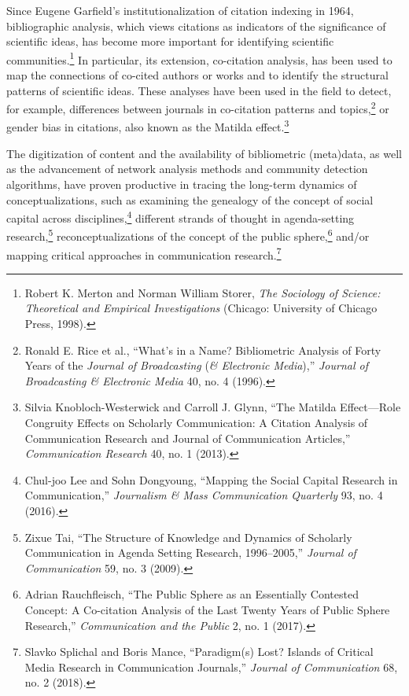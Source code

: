 \documentclass{tufte-handout}
\begin{document}
Since Eugene Garfield's institutionalization of citation indexing in
1964, bibliographic analysis, which views citations as indicators of the
significance of scientific ideas, has become more important for
identifying scientific communities.\footnote{Robert K. Merton and Norman
  William Storer, \emph{The Sociology of Science: Theoretical and
  Empirical Investigations} (Chicago: University of Chicago Press,
  1998).} In particular, its extension, co-citation analysis, has been
used to map the connections of co-cited authors or works and to identify
the structural patterns of scientific ideas. These analyses have been
used in the field to detect, for example, differences between journals
in co-citation patterns and topics,\footnote{Ronald E. Rice et al.,
  ``What's in a Name? Bibliometric Analysis of Forty Years of the
  \emph{Journal of Broadcasting} (\emph{\& Electronic Media}),''
  \emph{Journal of Broadcasting \& Electronic Media} 40, no. 4 (1996).}
or gender bias in citations, also known as the Matilda
effect.\footnote{Silvia Knobloch-Westerwick and Carroll J. Glynn, ``The
  Matilda Effect---Role Congruity Effects on Scholarly Communication: A
  Citation Analysis of Communication Research and Journal of
  Communication Articles,'' \emph{Communication Research} 40, no. 1
  (2013).}

The digitization of content and the availability of bibliometric
(meta)data, as well as the advancement of network analysis methods and
community detection algorithms, have proven productive in tracing the
long-term dynamics of conceptualizations, such as examining the
genealogy of the concept of social capital across
disciplines,\footnote{Chul-joo Lee and Sohn Dongyoung, ``Mapping the
  Social Capital Research in Communication,'' \emph{Journalism \& Mass
  Communication Quarterly} 93, no. 4 (2016).} different strands of
thought in agenda-setting research,\footnote{Zixue Tai, ``The Structure
  of Knowledge and Dynamics of Scholarly Communication in Agenda Setting
  Research, 1996--2005,'' \emph{Journal of Communication} 59, no. 3
  (2009).} reconceptualizations of the concept of the public
sphere,\footnote{Adrian Rauchfleisch, ``The Public Sphere as an
  Essentially Contested Concept: A Co-citation Analysis of the Last
  Twenty Years of Public Sphere Research,'' \emph{Communication and the
  Public} 2, no. 1 (2017).} and/or mapping critical approaches in
communication research.\footnote{Slavko Splichal and Boris Mance,
  ``Paradigm(s) Lost? Islands of Critical Media Research in
  Communication Journals,'' \emph{Journal of Communication} 68, no. 2
  (2018).}
\end{document}
